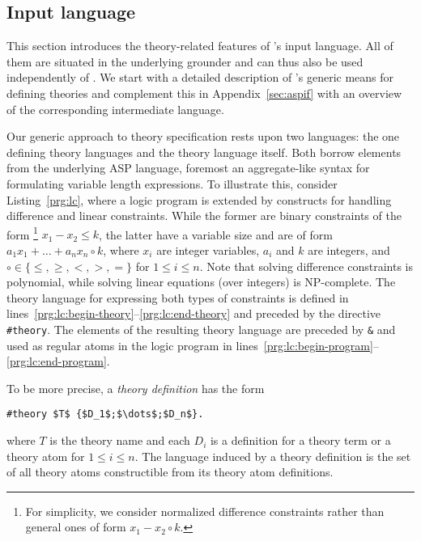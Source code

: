 \subsection{Input language}
\label{sec:language}

This section introduces the theory-related features of \clingo's input language.
All of them are situated in the underlying grounder \gringo{} and can thus
also be used independently of \clingo.
%
We start with a detailed description of \gringo's generic means for defining theories
and complement this in Appendix~\ref{sec:aspif} with an overview of the corresponding intermediate language.

Our generic approach to theory specification rests upon two languages:
the one defining theory languages and the theory language itself.
Both borrow elements from the underlying ASP language,
foremost an aggregate-like syntax for formulating variable length expressions.
To illustrate this, consider Listing~\ref{prg:lc},
where a logic program is extended by constructs for handling difference and linear constraints.
While the former are binary constraints of the form%
\footnote{For simplicity, we consider normalized difference constraints rather than general ones of form $x_1-x_2\circ k$.}
$x_1-x_2\leq k$, %
the latter have a variable size and are of form
\(
a_1x_1+\dots+a_nx_n\circ k
\),
where $x_i$ are integer variables, $a_i$ and $k$ are integers, and $\circ\in\{\leq,\geq,<,>,=\}$
for $1\leq i\leq n$.
Note that solving difference constraints is polynomial, while solving linear equations (over integers) is NP-complete.
The theory language for expressing both types of constraints is defined in lines~\ref{prg:lc:begin-theory}--\ref{prg:lc:end-theory} and preceded by the directive \lstinline{#theory}.
The elements of the resulting theory language are preceded by \lstinline{&} and used as regular atoms in the logic program in lines~\ref{prg:lc:begin-program}--\ref{prg:lc:end-program}.


To be more precise,
a \emph{theory definition} has the form
\begin{lstlisting}[numbers=none,mathescape=t,language=clingo]
#theory $T$ {$D_1$;$\dots$;$D_n$}.
\end{lstlisting}
where $T$ is the theory name and each $D_i$ is a definition for a theory term or a theory atom for $1\leq i\leq n$.
The language induced by a theory definition is the set of all theory atoms constructible from its theory atom definitions.

